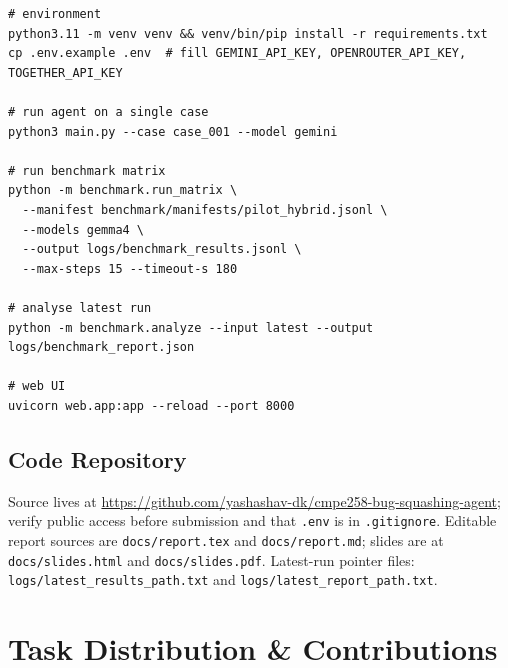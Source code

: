 \documentclass[11pt,letterpaper]{article}
\begin{document}
\begin{lstlisting}
# environment
python3.11 -m venv venv && venv/bin/pip install -r requirements.txt
cp .env.example .env  # fill GEMINI_API_KEY, OPENROUTER_API_KEY, TOGETHER_API_KEY

# run agent on a single case
python3 main.py --case case_001 --model gemini

# run benchmark matrix
python -m benchmark.run_matrix \
  --manifest benchmark/manifests/pilot_hybrid.jsonl \
  --models gemma4 \
  --output logs/benchmark_results.jsonl \
  --max-steps 15 --timeout-s 180

# analyse latest run
python -m benchmark.analyze --input latest --output logs/benchmark_report.json

# web UI
uvicorn web.app:app --reload --port 8000
\end{lstlisting}

\subsection{Code Repository}

Source lives at \url{https://github.com/yashashav-dk/cmpe258-bug-squashing-agent}; verify public access before submission and that \texttt{.env} is in \texttt{.gitignore}. Editable report sources are \texttt{docs/report.tex} and \texttt{docs/report.md}; slides are at \texttt{docs/slides.html} and \texttt{docs/slides.pdf}. Latest-run pointer files: \texttt{logs/latest\_results\_path.txt} and \texttt{logs/latest\_report\_path.txt}.

\section{Task Distribution \& Contributions}\label{sec:contrib}
\end{document}
